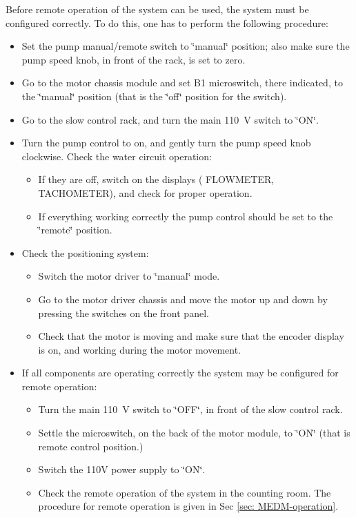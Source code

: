 Before remote operation of the system can be used, the system must
be configured correctly. To do this, one has to perform the following
procedure:

\begin{itemize}
\item Set the pump manual/remote switch to \char`\"{}manual\char`\"{} position;
also make sure the pump speed knob, in front of the rack, is set to
zero. 
\item Go to the motor chassis module and set B1 microswitch, there indicated,
to the \char`\"{}manual\char`\"{} position (that is the \char`\"{}off\char`\"{}
position for the switch).
\item Go to the slow control rack, and turn the main 110~V switch to \char`\"{}ON\char`\"{}.
\item Turn the pump control to on, and gently turn the pump speed knob clockwise.
Check the water circuit operation: 

\begin{itemize}
\item If they are off, switch on the displays ( FLOWMETER, TACHOMETER),
and check for proper operation.
\item If everything working correctly the pump control should be set to
the \char`\"{}remote\char`\"{} position. 
\end{itemize}
\item Check the positioning system:

\begin{itemize}
\item Switch the motor driver to \char`\"{}manual\char`\"{} mode. 
\item Go to the motor driver chassis and move the motor up and down by pressing
the switches on the front panel. 
\item Check that the motor is moving and make sure that the encoder display
is on, and working during the motor movement. 
\end{itemize}
\item If all components are operating correctly the system may be configured
for remote operation:

\begin{itemize}
\item Turn the main 110~V switch to \char`\"{}OFF\char`\"{}, in front of
the slow control rack.
\item Settle the microswitch, on the back of the motor module, to \char`\"{}ON\char`\"{}
(that is remote control position.)
\item Switch the 110V power supply to \char`\"{}ON\char`\"{}.
\item Check the remote operation of the system in the counting room. The
procedure for remote operation is given in Sec \ref{sec: MEDM-operation}.
\end{itemize}
\end{itemize}

